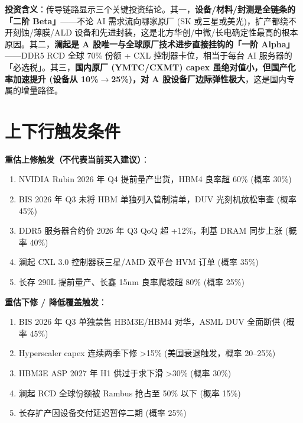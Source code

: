 \vspace{0.4em}
\noindent\textbf{投资含义}：传导链路显示三个关键投资结论。其一，\textbf{设备/材料/封测是全链条的「二阶 Beta」}——不论 AI 需求流向哪家原厂 (SK 或三星或美光)，扩产都绕不开刻蚀/薄膜/ALD 设备和先进封装，这是北方华创/中微/长电确定性最高的根本原因。其二，\textbf{澜起是 A 股唯一与全球原厂技术进步直接挂钩的「一阶 Alpha」}——DDR5 RCD 全球 70\% 份额 + CXL 控制器卡位，相当于每台 AI 服务器的「必选税」。其三，\textbf{国内原厂 (YMTC\slash CXMT) capex 虽绝对值小，但国产化率加速提升 (设备从 10\%\(\to\)25\%)，对 A 股设备厂边际弹性极大}，这是国内专属的增量路径。

\section{上下行触发条件}

\textbf{重估上修触发（不代表当前买入建议）}：
\begin{enumerate}[label=\protect\rmark]
  \item NVIDIA Rubin 2026 年 Q4 提前量产出货，HBM4 良率超 60\% (概率 30\%)
  \item BIS 2026 年 Q3 未将 HBM 单独列入管制清单，DUV 光刻机放松审查 (概率 45\%)
  \item DDR5 服务器合约价 2026 年 Q3 QoQ 超 +12\%，利基 DRAM 同步上涨 (概率 40\%)
  \item 澜起 CXL 3.0 控制器获三星/AMD 双平台 HVM 订单 (概率 35\%)
  \item 长存 290L 提前量产、长鑫 15nm 良率爬坡超 80\% (概率 25\%)
\end{enumerate}

\textbf{重估下修 / 降低覆盖触发}：
\begin{enumerate}[label=\protect\amark]
  \item BIS 2026 年 Q3 单独禁售 HBM3E/HBM4 对华，ASML DUV 全面断供 (概率 45\%)
  \item Hyperscaler capex 连续两季下修 >15\% (美国衰退触发，概率 20--25\%)
  \item HBM3E ASP 2027 年 H1 供过于求下滑 >30\% (概率 30\%)
  \item 澜起 RCD 全球份额被 Rambus 抢占至 50\% 以下 (概率 15\%)
  \item 长存扩产因设备交付延迟暂停二期 (概率 25\%)
\end{enumerate}

